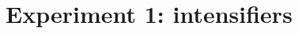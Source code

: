 \documentclass[10pt,letterpaper]{article}
\begin{document}



% 
% 
% 
\section{Experiment 1: intensifiers}
\end{document}
